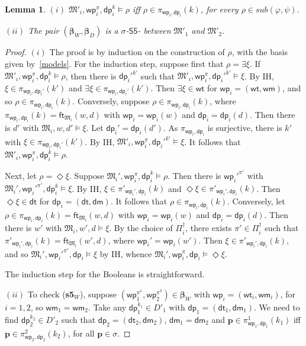 \documentclass[10pt,a4paper]{amsart}
\theoremstyle{plain}
\newtheorem{lem}[thm]{Lemma}
\theoremstyle{definition}
\newcommand{\sub}{\textit{sub}}
\newcommand{\BS}{$\mathsf{S5}$-\text{bisimulation}}
\newcommand{\wt}{\mathsf{wt}}
\newcommand{\dt}{\mathsf{dt}}
\newcommand{\ft}{\mathsf{ft}}
\newcommand{\wm}{\mathsf{wm}}
\newcommand{\dm}{\mathsf{dm}}
\newcommand{\iwp}{\mathsf{wp}_i}
\newcommand{\idp}{\mathsf{dp}_i}
\newcommand{\owp}{\mathsf{wp}_1}
\newcommand{\twp}{\mathsf{wp}_2}
\newcommand{\odp}{\mathsf{dp}_1}
\newcommand{\tdp}{\mathsf{dp}_2}
\newcommand{\bs}{\boldsymbol{\beta}}
\newcommand{\fform}[1]{\boldsymbol{#1}}
\newcommand{\pvar}{\fform{p}}
\begin{document}

\begin{lem}\label{types}
$(i)$ $\mathfrak M'_i, \iwp^\pi, \idp^k \models \rho$ iff $\rho \in \pi_{\iwp,\idp}(k)$, for every $\rho \in \sub(\varphi, \psi)$. 

$(ii)$ The pair $(\bs_{W},\bs_{D})$ is a $\sigma$-\BS{} between $\mathfrak M'_1$ and $\mathfrak M'_2$.
\end{lem}
%
\begin{proof}
	$(i)$ The proof is by induction on the construction of $\rho$, with the basis given by~\eqref{models}. For the induction step, suppose first that $\rho = \exists \xi$.
	If $\mathfrak M'_i,\iwp^\pi, \idp^k \models \rho$, then there is $\idp'^{k'}$ such that $\mathfrak M'_i, \iwp^\pi, \idp'^{k'} \models \xi$.
	By IH, $\xi\in \pi_{\iwp,\idp'}(k')$ and $\exists\xi \in \pi_{\iwp,\idp'}(k')$. 
	Then $\exists \xi \in \wt$ for $\iwp=(\wt,\wm)$, and so $\rho \in \pi_{\iwp,\idp}(k)$.
	Conversely, suppose $\rho \in \pi_{\iwp,\idp}(k)$, where $\pi_{\iwp,\idp}(k)= \ft_{\mathfrak{M}_{i}}(w,d)$ with $\iwp=\iwp(w)$ and $\idp=\idp(d)$. Then there is $d'$ with $\mathfrak{M}_{i}, w,d' \models \xi$. Let $\idp'=\idp(d')$. As $\pi_{\iwp,\idp}$ is surjective, there is $k'$ with $\xi\in \pi_{\iwp,\idp'}(k')$. By IH, $\mathfrak M'_i, \iwp^\pi, \idp'^{k'} \models \xi$. It follows that $\mathfrak M'_i, \iwp^\pi, \idp^k \models \rho$.
	
	Next, let $\rho = \Diamond \xi$. Suppose $\mathfrak{M}_{i}',\iwp^\pi, \idp^k \models \rho$. Then there is $\iwp'^{\pi'}$ with $\mathfrak{M}_{i}',\iwp'^{\pi'}, \idp^k \models \xi$. By IH, $\xi \in \pi'_{\iwp',\idp}(k)$ and $\Diamond \xi \in \pi'_{\iwp',\idp}(k)$. Then $\Diamond \xi  \in \dt$ for $\idp=(\dt,\dm)$. It follows that $\rho \in \pi_{\iwp,\idp}(k)$.
	Conversely, let $\rho \in \pi_{\iwp,\idp}(k) = \ft_{\mathfrak{M}_{i}}(w,d)$ with $\iwp=\iwp(w)$ and $\idp=\idp(d)$. Then there is $w'$ with $\mathfrak{M}_{i}, w', d \models \xi$. By the choice of $\Pi_{i}^{\dag}$, there exists $\pi' \in \Pi_{i}^{\dag}$ such that $\pi'_{\iwp',\idp}(k) = \ft_{\mathfrak{M}_{i}}(w',d)$, where $\iwp' = \iwp(w')$. Then $\xi \in \pi'_{\iwp',\idp}(k)$, and so $\mathfrak M_i', \iwp'^{\pi'}, \idp \models \xi$  by IH, whence $\mathfrak M_i', \iwp^{\pi},\idp \models \Diamond \xi$.
	
	The induction step for the Booleans is straightforward.

$(ii)$ To check (\textbf{s5}$_W$), suppose $(\owp^{\pi^1}, \twp^{\pi^2})\in\bs_W$ with $\iwp = (\wt_i, \wm_i)$, for $i = 1,2$, so $\wm_1 = \wm_2$. Take any $\odp^{k_1} \in D'_1$ with $\odp = (\dt_1, \dm_1)$. We need to find $\tdp^{k_2} \in D'_2$ such that $\tdp = (\dt_2, \dm_2)$, $\dm_1 = \dm_2$ and $\pvar \in \pi^1_{\owp,\odp}(k_1)$ iff $\pvar \in \pi^2_{\twp,\tdp}(k_2)$, for all $\pvar \in \sigma$.
	

\end{proof}
\end{document}
